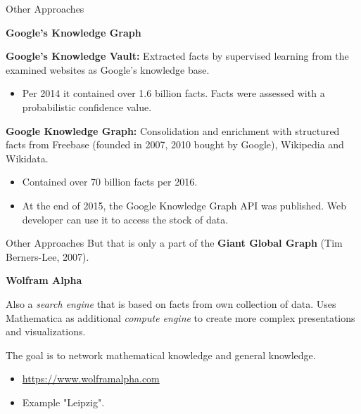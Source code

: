 \documentclass{beamer}
\newcommand{\ueberschrift}[1]{\begin{center}\bf #1\end{center}}
\begin{document}
\begin{frame}{Other Approaches}
\ueberschrift{Google's Knowledge Graph}

\textbf{Google's Knowledge Vault:} Extracted facts by supervised learning from
the examined websites as Google's knowledge base.
\begin{itemize}
\item Per 2014 it contained over 1.6 billion facts. Facts were assessed with a
  probabilistic confidence value.
\end{itemize}
\textbf{Google Knowledge Graph:} Consolidation and enrichment with structured
facts from Freebase (founded in 2007, 2010 bought by Google), Wikipedia and
Wikidata.
\begin{itemize}
\item Contained over 70 billion facts per 2016.
\item At the end of 2015, the Google Knowledge Graph API was published. Web
  developer can use it to access the stock of data.
\end{itemize}\vspace*{2em}
\end{frame}

\begin{frame}{Other Approaches}
But that is only a part of the \textbf{Giant Global Graph} (Tim Berners-Lee,
2007).
\ueberschrift{Wolfram Alpha}

Also a \emph{search engine} that is based on facts from own collection of
data.  Uses Mathematica as additional \emph{compute engine} to create more
complex presentations and visualizations.

The goal is to network mathematical knowledge and general knowledge.
\begin{itemize}
\item \url{https://www.wolframalpha.com}
\item Example "Leipzig".
\end{itemize}
\end{frame}
\end{document}
